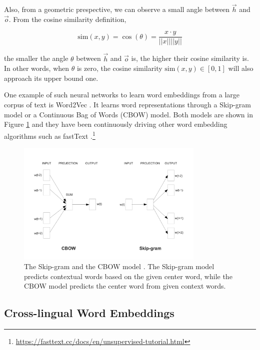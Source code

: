 \documentclass[thesis]{cluu}
\begin{document}
Also, from a geometric prespective, we can observe a small angle between $\vec{h}$ and $\vec{o}$. From the cosine similarity definition,

\begin{equation*}
  \text{sim}(x, y) = \cos(\theta) = \frac{x \cdot y}{||x||||y||}
\end{equation*}

\noindent the smaller the angle $\theta$ between $\vec{h}$ and $\vec{o}$ is, the higher their cosine similarity is. In other words, when $\theta$ is zero, the cosine similarity $\text{sim}(x, y) \in [0, 1]$ will also approach its upper bound one.

One example of such neural networks to learn word embeddings from a large corpus of text is Word2Vec \parencite{Mikolov:2013aa,Mikolov:2013ab}. It learns word representations through a Skip-gram model or a Continuous Bag of Words (CBOW) model. Both models are shown in Figure \ref{fig:skip_gram_and_cbow} and they have been continuously driving other word embedding algorithms such as fastText \parencite{Joulin:2018aa}.\footnote{\url{https://fasttext.cc/docs/en/unsupervised-tutorial.html}}

\begin{figure}
  \centering
  \includegraphics[width=0.8\textwidth]{skip_gram_and_cbow_models.png}
  \caption{The Skip-gram and the CBOW model \parencite{Mikolov:2013ac}. The Skip-gram model predicts contextual words based on the given center word, while the CBOW model predicts the center word from given context words.}
  \label{fig:skip_gram_and_cbow}
\end{figure}

\subsection{Cross-lingual Word Embeddings}
\label{sec:multilingual_word_embeddings}
\end{document}
